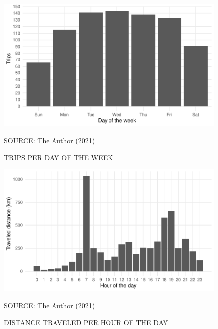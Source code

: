
\begin{figure}[!htbp]
    \centering\footnotesize
    \captionsetup{font=footnotesize}
    \caption{TRIPS PER DAY OF THE WEEK}
    \includegraphics{fig/dotw_trips.pdf}
    \label{fig:dotw_trips}
    \par SOURCE: The Author (2021)
\end{figure}


\begin{figure}[!htbp]
    \centering\footnotesize
    \captionsetup{font=footnotesize}
    \caption{DISTANCE TRAVELED PER HOUR OF THE DAY}
    \includegraphics{fig/hotd_dist.pdf}
    \label{fig:hotd_dist}
    \par SOURCE: The Author (2021)
\end{figure}



